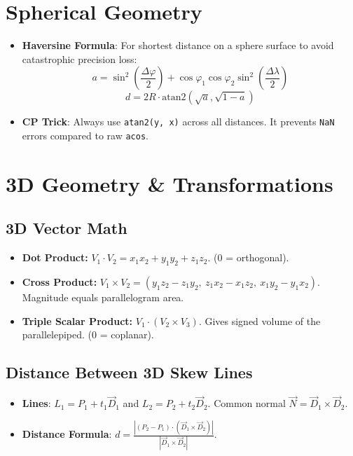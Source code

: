 \documentclass[12pt]{article}
\begin{document}
\section{Spherical Geometry}
\begin{itemize}
    \item \textbf{Haversine Formula}: For shortest distance on a sphere surface to avoid catastrophic precision loss:
    $$a = \sin^2\left(\frac{\Delta\varphi}{2}\right) + \cos\varphi_1 \cos\varphi_2 \sin^2\left(\frac{\Delta\lambda}{2}\right)$$
    $$d = 2R \cdot \text{atan2}(\sqrt{a}, \sqrt{1-a})$$
    \item \textbf{CP Trick}: Always use \texttt{atan2(y, x)} across all distances. It prevents \texttt{NaN} errors compared to raw \texttt{acos}.
\end{itemize}

\section{3D Geometry \& Transformations}

\subsection{3D Vector Math}
\begin{itemize}
    \item \textbf{Dot Product:} $V_1 \cdot V_2 = x_1x_2 + y_1y_2 + z_1z_2$. ($0$ = orthogonal).
    \item \textbf{Cross Product:} $V_1 \times V_2 = (y_1z_2 - z_1y_2, \ z_1x_2 - x_1z_2, \ x_1y_2 - y_1x_2)$. Magnitude equals parallelogram area.
    \item \textbf{Triple Scalar Product:} $V_1 \cdot (V_2 \times V_3)$. Gives signed volume of the parallelepiped. ($0$ = coplanar).
\end{itemize}

\subsection{Distance Between 3D Skew Lines}
\begin{itemize}
    \item \textbf{Lines}: $L_1 = P_1 + t_1 \vec{D}_1$ and $L_2 = P_2 + t_2 \vec{D}_2$. Common normal $\vec{N} = \vec{D}_1 \times \vec{D}_2$.
    \item \textbf{Distance Formula}: $d = \frac{|(P_2 - P_1) \cdot (\vec{D}_1 \times \vec{D}_2)|}{|\vec{D}_1 \times \vec{D}_2|}$.
\end{itemize}
\end{document}
